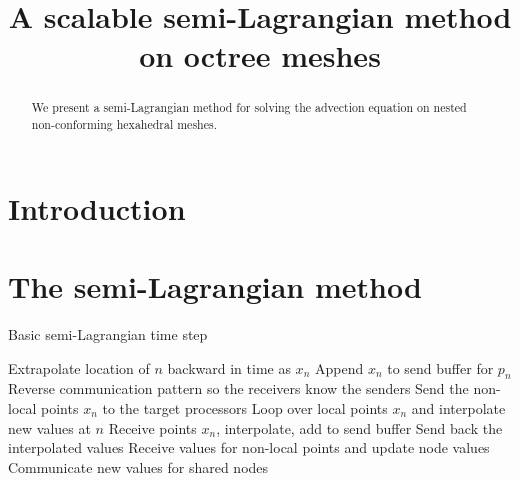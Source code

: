 \documentclass[11pt]{article}
\title{A scalable semi-Lagrangian method on octree meshes}
\author{}
\begin{document}
\maketitle

\begin{abstract}
We present a semi-Lagrangian method for solving the advection equation
on nested non-conforming hexahedral meshes.
\end{abstract}

\section{Introduction}

\section{The semi-Lagrangian method}

\begin{algorithm}
  \caption{Basic semi-Lagrangian time step}
  \begin{algorithmic}
        \STATE Extrapolate location of $n$ backward in time as $x_n$
	\STATE Append $x_n$ to send buffer for $p_n$
	\ENDIF
      \ENDFOR
    \ENDFOR
    \STATE Reverse communication pattern so the receivers know the senders
    \STATE Send the non-local points $x_n$ to the target processors
    \STATE Loop over local points $x_n$ and interpolate new values at $n$
    \STATE Receive points $x_n$, interpolate, add to send buffer
    \STATE Send back the interpolated values
    \STATE Receive values for non-local points and update node values
    \STATE Communicate new values for shared nodes
  \end{algorithmic}
\end{algorithm}
\end{document}
